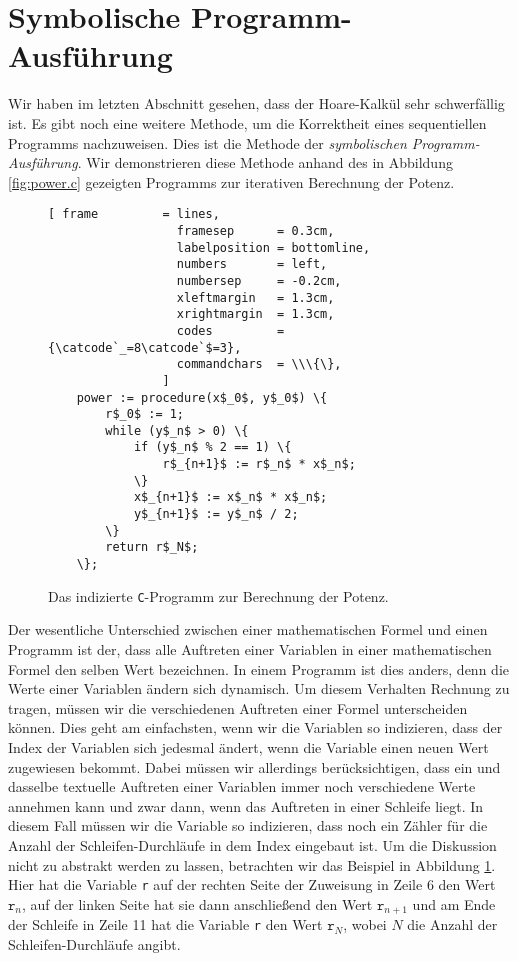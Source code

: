 \section{Symbolische Programm-Ausf\"uhrung}
Wir haben im letzten Abschnitt gesehen, dass der Hoare-Kalk\"ul sehr schwerf\"allig ist.  Es
gibt noch eine weitere Methode, um die Korrektheit eines sequentiellen Programms
nachzuweisen.  Dies ist die Methode der \emph{symbolischen Programm-Ausf\"uhrung}.  Wir
demonstrieren diese Methode anhand des in Abbildung \ref{fig:power.c} gezeigten
Programms zur iterativen Berechnung der Potenz.


\begin{figure}[!h]
\centering
\begin{Verbatim}[ frame         = lines, 
                  framesep      = 0.3cm, 
                  labelposition = bottomline,
                  numbers       = left,
                  numbersep     = -0.2cm,
                  xleftmargin   = 1.3cm,
                  xrightmargin  = 1.3cm,
                  codes         = {\catcode`_=8\catcode`$=3},
                  commandchars  = \\\{\},
                ]
    power := procedure(x$_0$, y$_0$) \{
        r$_0$ := 1;
        while (y$_n$ > 0) \{
            if (y$_n$ % 2 == 1) \{
                r$_{n+1}$ := r$_n$ * x$_n$;
            \} 
            x$_{n+1}$ := x$_n$ * x$_n$;
            y$_{n+1}$ := y$_n$ / 2;            
        \} 
        return r$_N$;
    \};
\end{Verbatim}
\vspace*{-0.3cm}
\caption{Das indizierte \texttt{C}-Programm zur Berechnung der Potenz.}
\label{fig:PowerIterative.iter}
\end{figure} %


Der wesentliche Unterschied zwischen einer mathematischen Formel und einen Programm ist
der, dass alle Auftreten einer Variablen in einer mathematischen Formel den selben Wert
bezeichnen.  In einem Programm ist dies anders, denn die Werte einer Variablen \"andern sich
dynamisch.  Um diesem  Verhalten Rechnung zu tragen, m\"ussen wir die verschiedenen
Auftreten einer Formel unterscheiden k\"onnen.  Dies geht am einfachsten, wenn wir die
Variablen so indizieren, dass der Index der Variablen sich jedesmal \"andert, wenn die
Variable einen neuen Wert zugewiesen bekommt. 
Dabei m\"ussen wir allerdings ber\"ucksichtigen, dass ein und dasselbe textuelle
Auftreten einer Variablen immer noch verschiedene Werte annehmen kann und zwar dann, wenn 
das Auftreten in einer Schleife liegt.  In diesem Fall m\"ussen wir die Variable so
indizieren, dass noch ein Z\"ahler f\"ur die Anzahl der Schleifen-Durchl\"aufe in dem Index
eingebaut ist.  Um die Diskussion nicht zu abstrakt werden zu lassen, betrachten wir das
Beispiel in Abbildung \ref{fig:PowerIterative.iter}.  Hier hat die Variable \texttt{r} auf
der rechten Seite der Zuweisung in Zeile 6 den Wert $\texttt{r}_n$, auf der linken Seite
hat sie dann anschlie{\ss}end den Wert $\texttt{r}_{n+1}$ und am Ende der Schleife in Zeile 11 hat die
Variable \texttt{r} den Wert $\texttt{r}_N$, wobei $N$ die Anzahl der Schleifen-Durchl\"aufe
angibt.

